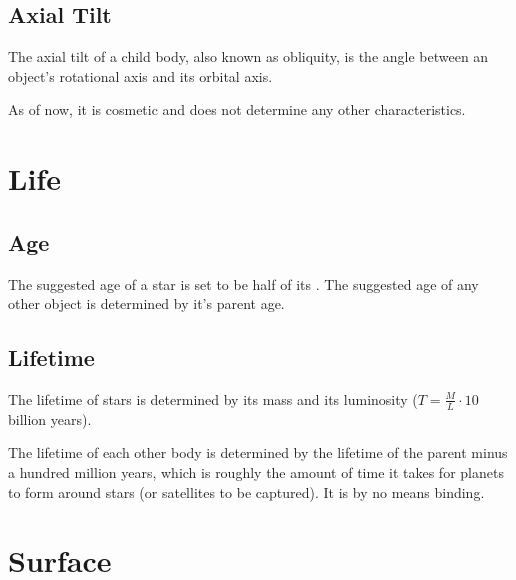 \documentclass[letterpaper,10pt,english]{sphinxmanual}
\begin{document}
\subsection{Axial Tilt}
\label{\detokenize{quantities/rotational/axial_tilt:axial-tilt}}\label{\detokenize{quantities/rotational/axial_tilt::doc}}\label{\detokenize{quantities/rotational/axial_tilt:id1}}
\sphinxAtStartPar
The axial tilt of a child body, also known as obliquity, is
the angle between an object’s rotational axis and its orbital axis.

\sphinxAtStartPar
As of now, it is cosmetic and does not determine any other characteristics.


\section{Life}
\label{\detokenize{quantities/life/life:life}}\label{\detokenize{quantities/life/life::doc}}

\subsection{Age}
\label{\detokenize{quantities/life/age:age}}\label{\detokenize{quantities/life/age::doc}}\label{\detokenize{quantities/life/age:id1}}
\sphinxAtStartPar
The suggested age of a star is set to be half of its {\hyperref[\detokenize{quantities/life/lifetime:id1}]{}}.
The suggested age of any other object is determined by it’s
parent age.


\subsection{Lifetime}
\label{\detokenize{quantities/life/lifetime:lifetime}}\label{\detokenize{quantities/life/lifetime::doc}}\label{\detokenize{quantities/life/lifetime:id1}}
\sphinxAtStartPar
The lifetime of stars is determined by its mass and its luminosity (\(T=\frac{M}{L} \cdot 10\) billion years).

\sphinxAtStartPar
The lifetime of each other body is determined by the lifetime of the parent
minus a hundred million years, which is roughly the amount of time it takes
for planets to form around stars (or satellites to be captured). It is by
no means binding.


\section{Surface}
\label{\detokenize{quantities/surface/surface:surface}}\label{\detokenize{quantities/surface/surface::doc}}\label{\detokenize{quantities/surface/surface:id1}}
\end{document}
